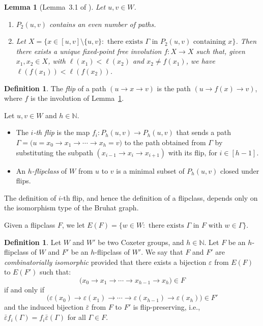 \documentclass[12pt,reqno]{amsart}
\theoremstyle{plain}
\newtheorem{lem}[thm]{Lemma}
\theoremstyle{definition}
\newtheorem{defn}[thm]{Definition}
\theoremstyle{remark}
\begin{document}
\begin{lem}[Lemma~3.1 of \cite{EMS}]
\label{mari}
Let $u,v \in W$. 
\begin{enumerate}
\item $P_2(u,v)$ contains an even number of paths.
\item Let $X=\{x\in [u,v]\setminus\{u,v\} : \text{ there exists $\Gamma$ in $P_2(u,v)$ containing $x$} \}$.  Then there exists a unique fixed-point free involution  $f :X \to X$ such that, given $x_1,x_2 \in X$, with $\ell(x_1) < \ell(x_2)$ and $x_2\neq f(x_1)$, we have $\ell(f(x_1)) < \ell(f(x_2))$.  
\end{enumerate} 
\end{lem}
\begin{defn}
\label{flipflip}
The \emph{flip} of a path $ (u{\longrightarrow} x {\longrightarrow} v)$ is the path  $(u{\longrightarrow} f(x) {\longrightarrow} v)$, where $f$ is the involution of Lemma~\ref{mari}.  

Let $u,v \in W$  and $h \in \mathbb N$. 
\begin{itemize}
\item
The {\em $i$-th flip} is the map $f_i: P_{h}(u,v) \to P_{h}(u,v)$ that sends a path $\Gamma = \big(u=x_0 {\longrightarrow} x_1 {\longrightarrow} \cdots {\longrightarrow} x_{h}=v\big)$ to the path obtained from $\Gamma$ by substituting the subpath $( x_{i-1} {\longrightarrow} x_i {\longrightarrow}  x_{i+1})$ with its flip, for $i\in [h-1]$.
\item 
An \emph{$h$-flipclass} of $W$ from $u$ to $v$ is a minimal subset of $P_{h}(u,v)$ closed under flips.
\end{itemize}
\end{defn}

The definition of $i$-th flip, and hence the definition of a flipclass, depends only on the isomorphism type of the Bruhat graph.

Given a flipclass $F$, we let $E(F) =\{w\in W : \textrm{ there exists $\Gamma$ in $F$ with $w\in \Gamma$}\}$. 
\begin{defn}
Let $W$ and $W'$ be two Coxeter groups,  and $h \in \mathbb N$. Let $F$ be an $h$-flipclass  of $W$ and $F'$ be an $h$-flipclass  of $W'$. 
 We say that $F$ and $F'$ are \emph{combinatorially isomorphic}  provided that there exists a bijection  $\varepsilon$  from $E(F)$ to $E(F')$ such that:
 $$\big(x_0{\longrightarrow} x_1 {\longrightarrow}  \cdots {\longrightarrow} x_{h-1}{\longrightarrow} x_h\big) \in F$$ if and only if  
$$\big(\varepsilon(x_0) {\longrightarrow} \varepsilon(x_1) {\longrightarrow}  \cdots {\longrightarrow} \varepsilon(x_{h-1}){\longrightarrow} \varepsilon(x_h)\big) \in F'$$ 
and  the induced  bijection $\bar{\varepsilon}$ from $F$ to $F'$ is flip-preserving, i.e., $\bar{\varepsilon}f_i(\Gamma)= f_{i} \bar{\varepsilon}(\Gamma)$  for all $\Gamma \in F$.
\end{defn}
\end{document}
